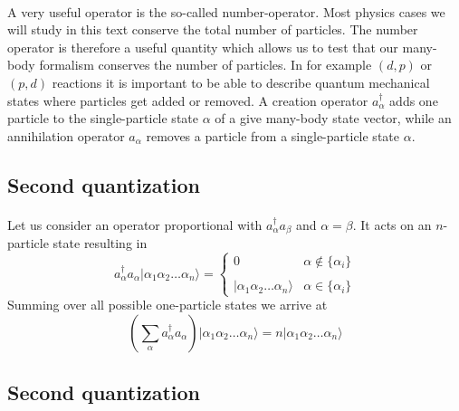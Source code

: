 \documentclass[%
twoside,                 %
final,                   %
10pt]{article}
\begin{document}
\paragraph{}
A very useful operator is the so-called number-operator.  Most physics cases  we will
study in this text conserve the total number of particles.  The number operator is therefore
a useful quantity which allows us to test that our many-body formalism  conserves the number of particles.
In for example $(d,p)$ or $(p,d)$ reactions it is important to be able to describe quantum mechanical states
where particles get added or removed.
A creation operator $a_\alpha^{\dagger}$ adds one particle to the single-particle state
$\alpha$ of a give many-body state vector, while an annihilation operator $a_\alpha$ 
removes a particle from a single-particle
state $\alpha$.





\subsection*{Second quantization}

\paragraph{}
Let us consider an operator proportional with $a_\alpha^{\dagger} a_\beta$ and 
$\alpha=\beta$. It acts on an $n$-particle state 
resulting in
\begin{equation}
	a_\alpha^{\dagger} a_\alpha |\alpha_1\alpha_2 \dots \alpha_{n}\rangle = 
	\begin{cases}
		0  &\alpha \notin \{\alpha_i\} \\
		\\
		|\alpha_1\alpha_2 \dots \alpha_{n}\rangle & \alpha \in \{\alpha_i\}
	\end{cases}
\end{equation}
Summing over all possible one-particle states we arrive at
\begin{equation}
	\left( \sum_\alpha a_\alpha^{\dagger} a_\alpha \right) |\alpha_1\alpha_2 \dots \alpha_{n}\rangle = 
	n |\alpha_1\alpha_2 \dots \alpha_{n}\rangle \label{eq:2-21}
\end{equation}




\subsection*{Second quantization}
\end{document}
